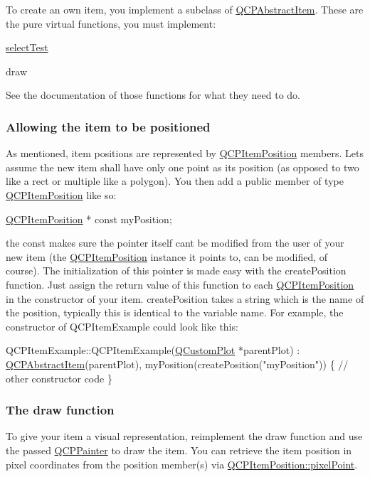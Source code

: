 To create an own item, you implement a subclass of \hyperlink{classQCPAbstractItem}{Q\+C\+P\+Abstract\+Item}. These are the pure virtual functions, you must implement\+: \begin{DoxyItemize}
\item \hyperlink{classQCPAbstractItem_aa7055ea577888915c52170eb8b8d1bc6}{select\+Test} \item draw\end{DoxyItemize}
See the documentation of those functions for what they need to do.\hypertarget{classQCPAbstractItem_items-positioning}{}\subsubsection{Allowing the item to be positioned}\label{classQCPAbstractItem_items-positioning}
As mentioned, item positions are represented by \hyperlink{classQCPItemPosition}{Q\+C\+P\+Item\+Position} members. Let\textquotesingle{}s assume the new item shall have only one point as its position (as opposed to two like a rect or multiple like a polygon). You then add a public member of type \hyperlink{classQCPItemPosition}{Q\+C\+P\+Item\+Position} like so\+:


\begin{DoxyCode}
\hyperlink{classQCPItemPosition}{QCPItemPosition} * \textcolor{keyword}{const} myPosition;
\end{DoxyCode}


the const makes sure the pointer itself can\textquotesingle{}t be modified from the user of your new item (the \hyperlink{classQCPItemPosition}{Q\+C\+P\+Item\+Position} instance it points to, can be modified, of course). The initialization of this pointer is made easy with the create\+Position function. Just assign the return value of this function to each \hyperlink{classQCPItemPosition}{Q\+C\+P\+Item\+Position} in the constructor of your item. create\+Position takes a string which is the name of the position, typically this is identical to the variable name. For example, the constructor of Q\+C\+P\+Item\+Example could look like this\+:


\begin{DoxyCode}
QCPItemExample::QCPItemExample(\hyperlink{classQCustomPlot}{QCustomPlot} *parentPlot) :
  \hyperlink{classQCPAbstractItem}{QCPAbstractItem}(parentPlot),
  myPosition(createPosition(\textcolor{stringliteral}{"myPosition"}))
\{
  \textcolor{comment}{// other constructor code}
\}
\end{DoxyCode}
\hypertarget{classQCPAbstractItem_items-drawing}{}\subsubsection{The draw function}\label{classQCPAbstractItem_items-drawing}
To give your item a visual representation, reimplement the draw function and use the passed \hyperlink{classQCPPainter}{Q\+C\+P\+Painter} to draw the item. You can retrieve the item position in pixel coordinates from the position member(s) via \hyperlink{classQCPItemPosition_ae490f9c76ee2ba33752c495d3b6e8fb5}{Q\+C\+P\+Item\+Position\+::pixel\+Point}.

